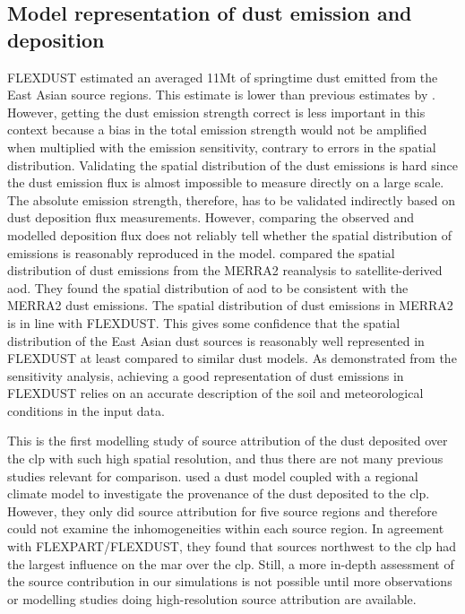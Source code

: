 \subsection{Model representation of dust emission and deposition}
FLEXDUST estimated an averaged 11Mt of springtime dust emitted from the East Asian source regions. This estimate is lower than previous estimates by \textcite{xuan2004identification}.
However, getting the dust emission strength correct is less important in this context because a bias in the total emission strength would not be amplified when multiplied with the emission sensitivity, contrary to errors in the spatial distribution.
Validating the spatial distribution of the dust emissions is hard since the dust emission flux is almost impossible to measure directly on a large scale. 
The absolute emission strength, therefore, has to be validated indirectly based on dust deposition flux measurements. 
However, comparing the observed and modelled deposition flux does not reliably tell whether the spatial distribution of emissions is reasonably reproduced in the model.
\textcite{liu2018influence} compared the spatial distribution of dust emissions from the MERRA2 reanalysis to satellite-derived \acrfull{aod}. 
They found the spatial distribution of \acrshort{aod} to be consistent with the MERRA2 dust emissions. 
The spatial distribution of dust emissions in MERRA2 is in line with FLEXDUST. This gives some confidence that the spatial distribution of the East Asian dust sources is reasonably well represented in FLEXDUST at least compared to similar dust models.
As demonstrated from the sensitivity analysis, achieving a good representation of dust emissions in FLEXDUST relies on an accurate description of the soil and meteorological conditions in the input data. 

This is the first modelling study of source attribution of the dust deposited over the \acrshort{clp}  with such high spatial resolution, and thus there are not many previous studies relevant for comparison. \textcite{shi2011distinguishing} used a dust model coupled with a regional climate model to investigate the provenance of the dust deposited to the \acrshort{clp}. 
However, they only did source attribution for five source regions and therefore could not examine the inhomogeneities within each source region.
In agreement with FLEXPART/FLEXDUST, they found that sources northwest to the \acrshort{clp} had the largest influence on the \acrshort{mar} over the \acrshort{clp}. 
Still, a more in-depth assessment of the source contribution in our simulations is not possible until more observations or modelling studies doing high-resolution source attribution are available.

